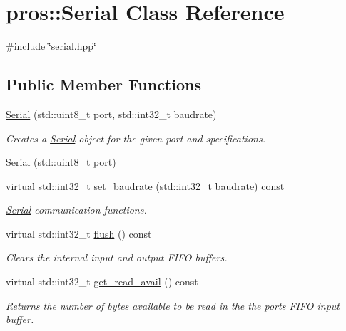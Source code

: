 \hypertarget{classpros_1_1Serial}{}\section{pros\+:\+:Serial Class Reference}
\label{classpros_1_1Serial}


{\ttfamily \#include \char`\"{}serial.\+hpp\char`\"{}}

\subsection*{Public Member Functions}
\begin{DoxyCompactItemize}
\item 
\hyperlink{classpros_1_1Serial_a20b7c3c88af816af3078939b048dcf4b}{Serial} (std\+::uint8\+\_\+t port, std\+::int32\+\_\+t baudrate)
\begin{DoxyCompactList}\small\item\em Creates a \hyperlink{classpros_1_1Serial}{Serial} object for the given port and specifications. \end{DoxyCompactList}\item 
\hyperlink{classpros_1_1Serial_a32311eebb33cab5a52e0a8743d3bd9da}{Serial} (std\+::uint8\+\_\+t port)
\item 
virtual std\+::int32\+\_\+t \hyperlink{classpros_1_1Serial_ab8c6d804852e6689d6c92c6b2c439824}{set\+\_\+baudrate} (std\+::int32\+\_\+t baudrate) const
\begin{DoxyCompactList}\small\item\em \hyperlink{classpros_1_1Serial}{Serial} communication functions. \end{DoxyCompactList}\item 
virtual std\+::int32\+\_\+t \hyperlink{classpros_1_1Serial_a4d897c6f3f83636f4d4627ab02c10e76}{flush} () const
\begin{DoxyCompactList}\small\item\em Clears the internal input and output F\+I\+FO buffers. \end{DoxyCompactList}\item 
virtual std\+::int32\+\_\+t \hyperlink{classpros_1_1Serial_aca502997319088ea71cf870fbbca7eb8}{get\+\_\+read\+\_\+avail} () const
\begin{DoxyCompactList}\small\item\em Returns the number of bytes available to be read in the the port\textquotesingle{}s F\+I\+FO input buffer. \end{DoxyCompactList}\item 

\end{DoxyCompactItemize}
